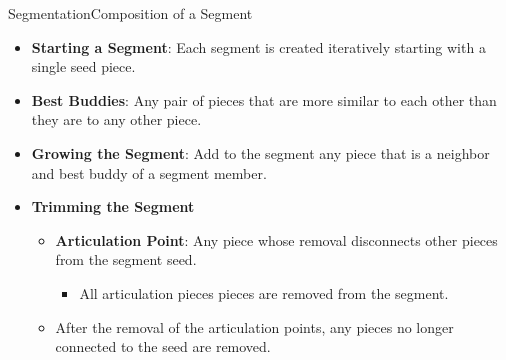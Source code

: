 \documentclass[10pt]{beamer}
\begin{document}
\begin{frame}{Segmentation}{Composition of a Segment}
  \begin{itemize}
    \setlength\itemsep{0.8em}
    \item \textbf{Starting a Segment}: Each segment is created iteratively starting with a single seed piece.
    \vfill
    \item \textbf{Best Buddies}: Any pair of pieces that are more similar to each other than they are to any other piece.
    \vfill 
    \item \textbf{Growing the Segment}: Add to the segment any piece that is a neighbor and best buddy of a segment member.
    \vfill
    \item \textbf{Trimming the Segment}
    \begin{itemize}
    \setlength\itemsep{0.8em}
	    \item \textbf{Articulation Point}: Any piece whose removal disconnects other pieces from the segment seed.
	    \vspace{0.4em}
	    \begin{itemize}
	      \item All articulation pieces pieces are removed from the segment.  
	    \end{itemize}
	    \item After the removal of the articulation points, any pieces no longer connected to the seed are removed.
    \end{itemize}
  \end{itemize}
\end{frame}
\end{document}
